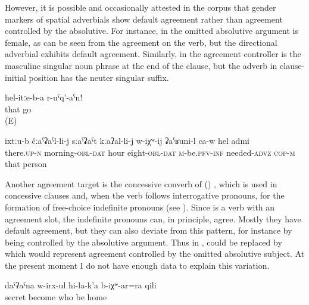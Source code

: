 However, it is possible and occasionally attested in the corpus that gender markers of spatial adverbials show default agreement rather than agreement controlled by the absolutive. For instance, in  the omitted absolutive argument is female, as can be seen from the agreement on the verb, but the directional adverbial exhibits default agreement. Similarly, in  the agreement controller is the masculine singular noun phrase at the end of the clause, but the adverb in clause-initial position has the neuter  singular suffix. 
%
\begin{exe}
	\ex	\label{ex:‎‎‎Go like that (i.e. in that direction)}
	\gll	hel-itːe-b-a	r-uˁq'-aˁn!\\
		that	go\\
	\glt	{} (E)
	
			\ex	\label{ex:This person needs to be there in the morning at 8 o'clockAA}
		\gll	ixtːu-b	čːaˁʡaˁl-li-j	sːaˁʡaˁt	kːaʔal-li-j	w-iχʷ-ij	ʡaˁʁuni-l	ca-w	hel	admi \\
			there.\textsc{up}-\textsc{n}	morning-\textsc{obl}-\textsc{dat} hour	eight-\textsc{obl}-\textsc{dat}	\textsc{m}-be.\textsc{pfv}-\textsc{inf} needed-\textsc{advz}	\textsc{cop-m} that person\\
		\glt	{}	
		
\end{exe}

Another agreement target is the concessive converb of  () , which is used in concessive clauses and, when the verb follows interrogative pronouns, for the formation of free-choice indefinite pronouns (see ). Since  is a verb with an agreement slot, the indefinite pronouns can, in principle, agree. Mostly they have default agreement, but they can also deviate from this pattern, for instance by being controlled by the absolutive argument. Thus in ,  could be replaced by  which would represent agreement controlled by the omitted absolutive subject. At the present moment I do not have enough data to explain this variation.  
%
\begin{exe}
	\ex	\label{ex:(he was) hiding at the house of whomever}
	\gll	daˁʡaˁna	w-irx-ul	hi-la-k'a	b-iχʷ-ar=ra	qili\\
		secret	become	who	be	home\\
	\glt	{}
\end{exe}


